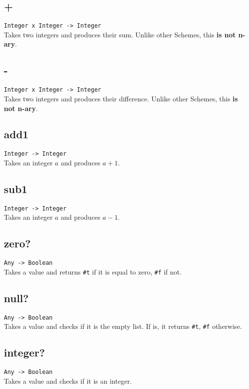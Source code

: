 \subsection*{+}
\texttt{Integer x Integer -> Integer}\\
\noindent Takes two integers and produces their sum. Unlike other Schemes, this \textbf{is not n-ary}.

\subsection*{-}
\texttt{Integer x Integer -> Integer}\\
\noindent Takes two integers and produces their difference. Unlike other Schemes, this \textbf{is not n-ary}.

\subsection*{add1}
\texttt{Integer -> Integer}\\
\noindent Takes an integer $a$  and produces $a+1$.

\subsection*{sub1}
\texttt{Integer -> Integer}\\
\noindent Takes an integer $a$  and produces $a-1$.

\subsection*{zero?}
\texttt{Any -> Boolean}\\
\noindent Takes a value and returns \texttt{\#t} if it is equal to zero, \texttt{\#f} if not.

\subsection*{null?}
\texttt{Any -> Boolean}\\
\noindent Takes a value and checks if it is the empty list. If is, it returns \texttt{\#t}, \texttt{\#f}
otherwise.

\subsection*{integer?}
\texttt{Any -> Boolean}\\
\noindent Takes a value and checks if it is an integer.

